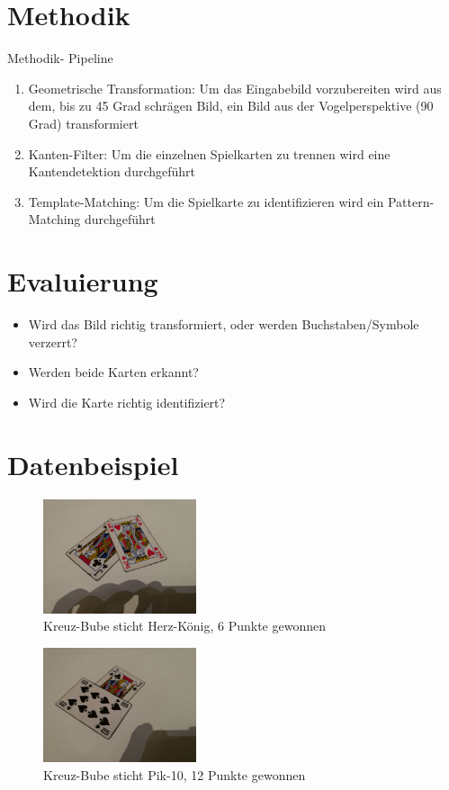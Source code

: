 \documentclass[deutsch]{scrartcl}
\begin{document}
\section{Methodik}
Methodik- Pipeline
\begin{enumerate}
	\item Geometrische Transformation: Um das Eingabebild vorzubereiten wird aus dem, bis zu 45 Grad schrägen Bild, ein Bild aus der Vogelperspektive (90 Grad) transformiert
	\item Kanten-Filter: Um die einzelnen Spielkarten zu trennen wird eine Kantendetektion durchgeführt
	\item Template-Matching: Um die Spielkarte zu identifizieren wird ein Pattern-Matching durchgeführt
\end{enumerate}
\section{Evaluierung}
\begin{itemize}
	\item Wird das Bild richtig transformiert, oder werden Buchstaben/Symbole verzerrt?
	\item Werden beide Karten erkannt?
	\item Wird die Karte richtig identifiziert?
\end{itemize}
\section{Datenbeispiel}
\begin{figure}[h!]
 \centering
 \includegraphics[width=0.4\textwidth]{datenbeispiel.jpg}
 \caption{Kreuz-Bube sticht Herz-König, 6 Punkte gewonnen}
 \label{fig:img}
\end{figure}
\begin{figure}[h!]
 \centering
 \includegraphics[width=0.4\textwidth]{datenbeispiel2.jpg}
 \caption{Kreuz-Bube sticht Pik-10, 12 Punkte gewonnen}
 \label{fig:img}
\end{figure}
\newpage
\end{document}
